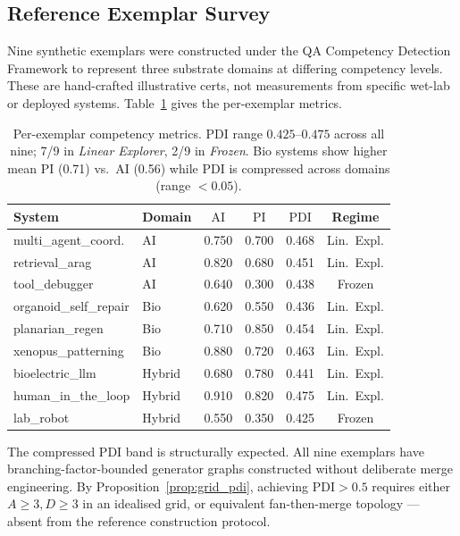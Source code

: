 \documentclass[11pt,letterpaper]{article}
\theoremstyle{plain}
\theoremstyle{definition}
\theoremstyle{remark}
\newcommand{\PDI}{\mathrm{PDI}}
\newcommand{\AI}{\mathrm{AI}}
\newcommand{\PI}{\mathrm{PI}}
\begin{document}
\subsection{Reference Exemplar Survey}
\label{sec:baseline}

Nine synthetic exemplars were constructed under the QA Competency
Detection Framework \cite{QAFamily26Cert} to represent three substrate
domains at differing competency levels.
These are hand-crafted illustrative certs, not measurements from
specific wet-lab or deployed systems.
Table~\ref{tab:refset} gives the per-exemplar metrics.

\begin{table}[h]
  \centering
  \small
  \begin{tabular}{llcccc}
    \toprule
    System & Domain & $\AI$ & $\PI$ & $\PDI$ & Regime \\
    \midrule
    multi\_agent\_coord.   & AI     & 0.750 & 0.700 & 0.468 & Lin.\ Expl. \\
    retrieval\_arag        & AI     & 0.820 & 0.680 & 0.451 & Lin.\ Expl. \\
    tool\_debugger         & AI     & 0.640 & 0.300 & 0.438 & Frozen      \\
    organoid\_self\_repair & Bio    & 0.620 & 0.550 & 0.436 & Lin.\ Expl. \\
    planarian\_regen       & Bio    & 0.710 & 0.850 & 0.454 & Lin.\ Expl. \\
    xenopus\_patterning    & Bio    & 0.880 & 0.720 & 0.463 & Lin.\ Expl. \\
    bioelectric\_llm       & Hybrid & 0.680 & 0.780 & 0.441 & Lin.\ Expl. \\
    human\_in\_the\_loop   & Hybrid & 0.910 & 0.820 & 0.475 & Lin.\ Expl. \\
    lab\_robot             & Hybrid & 0.550 & 0.350 & 0.425 & Frozen      \\
    \bottomrule
  \end{tabular}
  \caption{Per-exemplar competency metrics.
    $\PDI$ range $0.425$--$0.475$ across all nine; 7/9 in
    \emph{Linear Explorer}, 2/9 in \emph{Frozen}.
    Bio systems show higher mean $\PI$ (0.71) vs.\ AI (0.56)
    while $\PDI$ is compressed across domains (range $< 0.05$).}
  \label{tab:refset}
\end{table}

The compressed $\PDI$ band is structurally expected.
All nine exemplars have branching-factor-bounded generator graphs
constructed without deliberate merge engineering.
By Proposition~\ref{prop:grid_pdi}, achieving $\PDI > 0.5$ requires
either $A \geq 3, D \geq 3$ in an idealised grid, or equivalent
fan-then-merge topology --- absent from the reference construction protocol.
\end{document}
